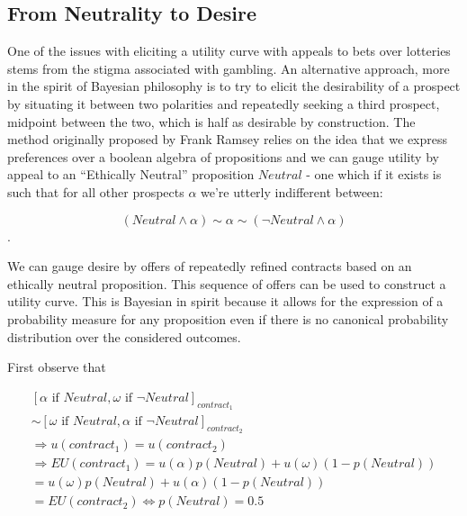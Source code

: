 \documentclass[]{tufte-book}
\theoremstyle{definition}
\theoremstyle{definition}
\theoremstyle{definition}
\theoremstyle{remark}
\begin{document}
\hypertarget{from-neutrality-to-desire}{%
\subsection{From Neutrality to Desire}\label{from-neutrality-to-desire}}

One of the issues with eliciting a utility curve with appeals to bets over lotteries stems from the stigma associated with gambling. An alternative approach, more in the spirit of Bayesian philosophy is to try to elicit the desirability of a prospect by situating it between two polarities and repeatedly seeking a third prospect, midpoint between the two, which is half as desirable by construction. The method originally proposed by Frank Ramsey relies on the idea that we express preferences over a boolean algebra of propositions and we can gauge utility by appeal to an ``Ethically Neutral'' proposition \(Neutral\) - one which if it exists is such that for all other prospects \(\alpha\) we're utterly indifferent between:

\[(Neutral \wedge \alpha) \sim \alpha \sim (\neg Neutral \wedge \alpha)\].

We can gauge desire by offers of repeatedly refined contracts based on an ethically neutral proposition. This sequence of offers can be used to construct a utility curve. This is Bayesian in spirit because it allows for the expression of a probability measure for any proposition even if there is no canonical probability distribution over the considered outcomes.

\noindent First observe that

\begin{equation}
\begin{split}
[ \alpha \text{ if } Neutral, \omega \text{ if } \neg Neutral ]_{contract_{1}} \\  \sim [ \omega  \text{ if } Neutral, \alpha \text{ if } \neg Neutral ]_{contract_{2}} \\   \Rightarrow u(contract_{1})  = u(contract_{2})   \\  \Rightarrow EU(contract_{1}) = u(\alpha)p(Neutral) + u(\omega)(1-p(Neutral)) \\ 
= u(\omega)p(Neutral) + u(\alpha)(1-p(Neutral)) \\ 
= EU(contract_{2}) \Leftrightarrow p(Neutral) = 0.5
\end{split}
\end{equation}
\end{document}
